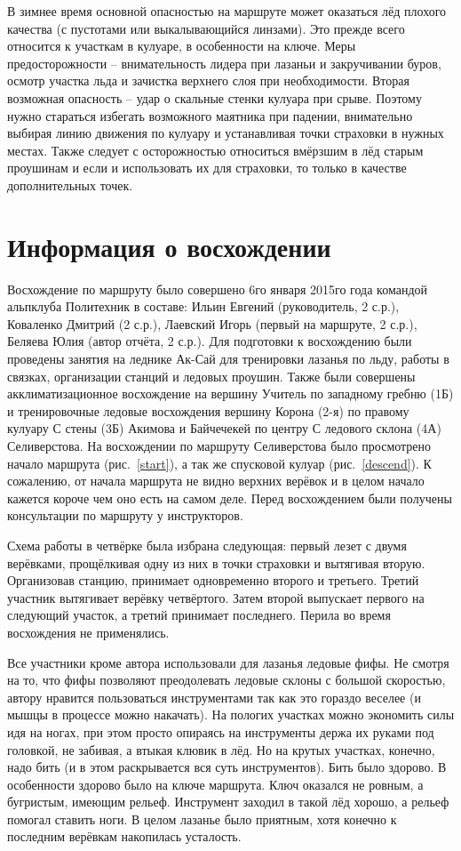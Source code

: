 \documentclass[fleqn, 10pt]{extarticle}
\begin{document}
	В зимнее время основной опасностью на маршруте может оказаться лёд плохого качества (с пустотами или выкалывающийся линзами).
	Это прежде всего относится к участкам в кулуаре, в особенности на ключе. Меры предосторожности -- внимательность лидера при лазаньи и закручивании буров, осмотр участка льда
	и зачистка верхнего слоя при необходимости. Вторая возможная опасность -- удар о скальные стенки кулуара при срыве. Поэтому нужно стараться избегать возможного маятника при падении, внимательно выбирая линию
	движения по кулуару и устанавливая точки страховки в нужных местах.
	Также следует с осторожностью относиться вмёрзшим в лёд старым проушинам и если и использовать их для страховки, то только в качестве дополнительных точек.

\section{Информация о восхождении}
	Восхождение по маршруту было совершено 6го января 2015го года командой альпклуба Политехник в составе: Ильин Евгений (руководитель, 2 с.р.), Коваленко Дмитрий (2 с.р.),
	Лаевский Игорь (первый на маршруте, 2 с.р.), Беляева Юлия (автор отчёта, 2 с.р.). Для подготовки к восхождению были проведены занятия на леднике Ак-Сай для
	тренировки лазанья по льду, работы в связках, организации станций и ледовых проушин. Также были совершены акклиматизационное восхождение на вершину Учитель по западному гребню (1Б) 
	и тренировочные ледовые восхождения вершину
	Корона (2-я) по правому кулуару С стены (3Б) Акимова и Байчечекей по центру С ледового склона (4А) Селиверстова. На восхождении по маршруту Селиверстова было просмотрено начало маршрута
	(рис.~\ref{start}), а так же спусковой кулуар (рис.~\ref{descend}). К сожалению, от начала маршрута не видно верхних верёвок и в целом начало кажется короче чем оно есть на самом деле.
	Перед восхождением были получены консультации по маршруту у инструкторов.

	Схема работы в четвёрке была избрана следующая: первый лезет с двумя верёвками, прощёлкивая одну из них в точки страховки и вытягивая вторую. Организовав станцию, принимает одновременно
	второго и третьего. Третий участник вытягивает верёвку четвёртого. Затем второй выпускает первого на следующий участок, а третий принимает последнего. Перила во время восхождения не применялись.

	Все участники кроме автора использовали для лазанья ледовые фифы. Не смотря на то, что фифы позволяют преодолевать ледовые склоны с большой скоростью, автору нравится пользоваться
	инструментами так как это гораздо веселее (и мышцы в процессе можно накачать). На пологих участках можно экономить силы идя на ногах, при этом просто опираясь на инструменты
	держа их руками под головкой, не забивая, а втыкая клювик в лёд. Но на крутых участках, конечно, надо бить (и в этом раскрывается вся суть инструментов). Бить было здорово.
	В особенности здорово было на ключе маршрута. Ключ оказался не ровным, а бугристым, имеющим рельеф. Инструмент заходил в такой лёд хорошо, а рельеф помогал ставить ноги. В целом лазанье
	было приятным, хотя конечно к последним верёвкам накопилась усталость.
\end{document}
